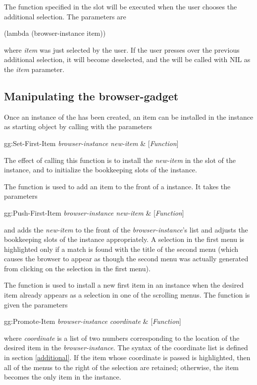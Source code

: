 The function specified in the slot 
will be executed when the user chooses the additional selection.  The
parameters are
\begin{programexample}
(lambda (browser-instance item))
\end{programexample}
where {\it item} was just selected by the user.  If
the user presses over the previous additional selection, it will
become deselected, and the
 will be called with NIL as the
{\it item} parameter.

\subsection{Manipulating the browser-gadget}
\label{manipulating}

 Once an instance of the  has
been created, an item can be installed in the instance as starting
object by calling {\bf {}} with the parameters
\begin{programexample}
gg:Set-First-Item {\it browser-instance new-item} & [{\it Function}]
\end{programexample}
The effect of calling this function is to install
the {\it new-item} in the  slot of the instance, and to
initialize the bookkeeping slots of the instance.

 The function {\bf {}} is used
to add an item to the front of a  instance.  It
takes the parameters
\begin{programexample}
gg:Push-First-Item {\it browser-instance new-item} & [{\it Function}]
\end{programexample}
and adds the {\it new-item} to the front of the
{\it browser-instance}'s  list and adjusts the bookkeeping
slots of the instance appropriately.  A selection in the first menu is
highlighted only if a match is found with the title of the second menu
(which causes the browser to appear as though the second menu was
actually generated from clicking on the selection in the first menu).

 The function {\bf {}} is used to
install a new first item in an instance when the desired item already
appears as a selection in one of the scrolling menus.  The function is
given the parameters
\begin{programexample}
gg:Promote-Item {\it browser-instance coordinate} & [{\it Function}]
\end{programexample}
where {\it coordinate} is a list of two numbers
corresponding to the location of the desired item in the
{\it browser-instance}.  The syntax of the coordinate list is defined in
section \ref{additional}.  If the item whose coordinate is passed is
highlighted, then all of the menus to the right of the selection are
retained; otherwise, the item becomes the only item in the instance.

